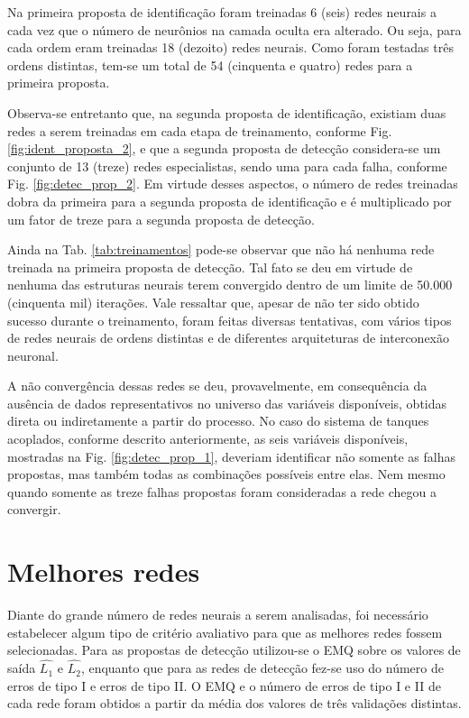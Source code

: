 Na primeira proposta de identificação foram treinadas 6 (seis) redes neurais a
cada vez que o número de neurônios na camada oculta era alterado. Ou seja, para
cada ordem eram treinadas 18 (dezoito) redes neurais. Como foram testadas três
ordens distintas, tem-se um total de 54 (cinquenta e quatro) redes para a
primeira proposta.

Observa-se entretanto que, na segunda proposta de identificação, existiam duas
redes a serem treinadas em cada etapa de treinamento, conforme Fig.
\ref{fig:ident_proposta_2}, e que a segunda proposta de detecção considera-se um
conjunto de 13 (treze) redes especialistas, sendo uma para cada falha, conforme
Fig. \ref{fig:detec_prop_2}. Em virtude desses aspectos, o número de redes
treinadas dobra da primeira para a segunda proposta de identificação e é
multiplicado por um fator de treze para a segunda proposta de detecção.

Ainda na Tab. \ref{tab:treinamentos} pode-se observar que não há nenhuma rede
treinada na primeira proposta de detecção. Tal fato se deu em virtude de nenhuma
das estruturas neurais terem convergido dentro de um limite de 50.000 (cinquenta
mil) iterações. Vale ressaltar que, apesar de não ter sido obtido sucesso
durante o treinamento, foram feitas diversas tentativas, com vários tipos de
redes neurais de ordens distintas e de diferentes arquiteturas de interconexão
neuronal. 

A não convergência dessas redes se deu, provavelmente, em consequência da
ausência de dados representativos no universo das variáveis disponíveis, obtidas
direta ou indiretamente a partir do processo. No caso do sistema de tanques
acoplados, conforme descrito anteriormente, as seis variáveis disponíveis,
mostradas na Fig. \ref{fig:detec_prop_1}, deveriam identificar não somente as
falhas propostas, mas também todas as combinações possíveis entre elas. Nem
mesmo quando somente as treze falhas propostas foram consideradas a rede chegou
a convergir.

\section{Melhores redes}
Diante do grande número de redes neurais a serem analisadas, foi necessário
estabelecer algum tipo de critério avaliativo para que as melhores redes fossem
selecionadas. Para as propostas de detecção utilizou-se o EMQ sobre os valores
de saída $\widehat{L_1}$ e $\widehat{L_2}$, enquanto que para as redes de
detecção fez-se uso do número de erros de tipo I e erros de tipo II.  O EMQ e o
número de erros de tipo I e II de cada rede foram obtidos a partir da média dos
valores de três validações distintas.

